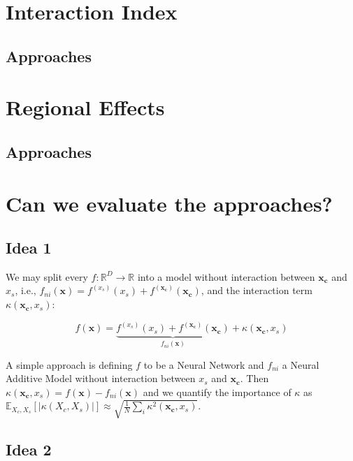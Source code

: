 \documentclass[12pt]{article}
\newcommand{\xb}{\mathbf{x}}
\newcommand{\xc}{\mathbf{x_c}}
\newcommand{\fxc}{f^{(\xc)}}
\newcommand{\fxs}{f^{(x_s)}}
\begin{document}
    \section{Interaction Index}
    \subsection{Approaches}
    \section{Regional Effects}
    \subsection{Approaches}

    \section{Can we evaluate the approaches?}

    \subsection{Idea 1}

    We may split every $f: \mathbb{R}^D \rightarrow \mathbb{R}$ into
    a model without interaction between $\xc$ and $x_s$,
    i.e., $f_{ni}(\xb) = \fxs(x_s) +  \fxc(\xc)$,
    and the interaction term $\kappa(\xc, x_s)$:

    \[
      f(\xb) = \underbrace{\fxs(x_s) +  \fxc(\xc)}_{f_{ni}(\xb)} + \kappa(\xc, x_s)
    \]

    A simple approach is defining \(f\) to be a Neural Network and \(f_{ni}\) a Neural Additive Model without interaction
    between \(x_s\) and \(\xc\). Then \(\kappa(\xc, x_s) = f(\xb) - f_{ni}(\xb)\) and we quantify the importance of \(\kappa\) as \(\mathbb{E}_{X_c, X_s} \left [ |\kappa(X_c, X_s)| \right ] \approx \sqrt{\frac{1}{N} \sum_i \kappa^2(\xc, x_s)} \).

    \subsection{Idea 2}
\end{document}
